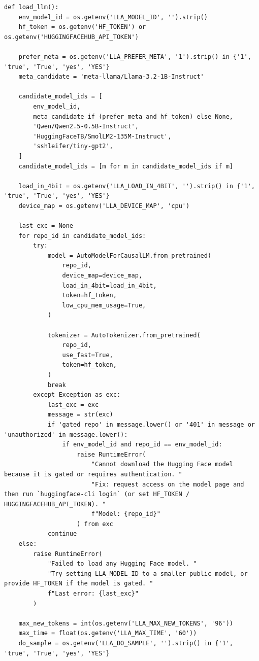 \documentclass[11pt,a4paper]{article}
\begin{document}
\begin{lstlisting}
def load_llm():
    env_model_id = os.getenv('LLA_MODEL_ID', '').strip()
    hf_token = os.getenv('HF_TOKEN') or os.getenv('HUGGINGFACEHUB_API_TOKEN')

    prefer_meta = os.getenv('LLA_PREFER_META', '1').strip() in {'1', 'true', 'True', 'yes', 'YES'}
    meta_candidate = 'meta-llama/Llama-3.2-1B-Instruct'

    candidate_model_ids = [
        env_model_id,
        meta_candidate if (prefer_meta and hf_token) else None,
        'Qwen/Qwen2.5-0.5B-Instruct',
        'HuggingFaceTB/SmolLM2-135M-Instruct',
        'sshleifer/tiny-gpt2',
    ]
    candidate_model_ids = [m for m in candidate_model_ids if m]

    load_in_4bit = os.getenv('LLA_LOAD_IN_4BIT', '').strip() in {'1', 'true', 'True', 'yes', 'YES'}
    device_map = os.getenv('LLA_DEVICE_MAP', 'cpu')

    last_exc = None
    for repo_id in candidate_model_ids:
        try:
            model = AutoModelForCausalLM.from_pretrained(
                repo_id,
                device_map=device_map,
                load_in_4bit=load_in_4bit,
                token=hf_token,
                low_cpu_mem_usage=True,
            )

            tokenizer = AutoTokenizer.from_pretrained(
                repo_id,
                use_fast=True,
                token=hf_token,
            )
            break
        except Exception as exc:
            last_exc = exc
            message = str(exc)
            if 'gated repo' in message.lower() or '401' in message or 'unauthorized' in message.lower():
                if env_model_id and repo_id == env_model_id:
                    raise RuntimeError(
                        "Cannot download the Hugging Face model because it is gated or requires authentication. "
                        "Fix: request access on the model page and then run `huggingface-cli login` (or set HF_TOKEN / HUGGINGFACEHUB_API_TOKEN). "
                        f"Model: {repo_id}"
                    ) from exc
            continue
    else:
        raise RuntimeError(
            "Failed to load any Hugging Face model. "
            "Try setting LLA_MODEL_ID to a smaller public model, or provide HF_TOKEN if the model is gated. "
            f"Last error: {last_exc}"
        )

    max_new_tokens = int(os.getenv('LLA_MAX_NEW_TOKENS', '96'))
    max_time = float(os.getenv('LLA_MAX_TIME', '60'))
    do_sample = os.getenv('LLA_DO_SAMPLE', '').strip() in {'1', 'true', 'True', 'yes', 'YES'}


\end{lstlisting}
\end{document}
